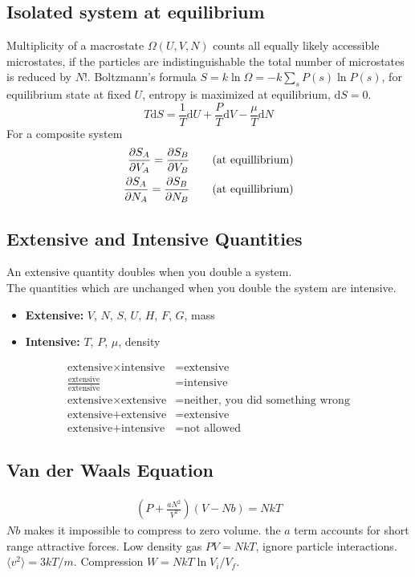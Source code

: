 \documentclass[a4paper, norsk, 8pt]{article}
\begin{document}
\begin{multicols*}{3}
\subsection*{\footnotesize  Isolated system at equilibrium}
Multiplicity of a macrostate $\Omega(U,V,N)$ counts all equally likely accessible microstates, if the particles are indistinguishable the total number of microstates is reduced by $N!$. Boltzmann's formula $S=k\ln{\Omega} = -k\sum_{s}P(s)\ln{P(s)}$, for equilibrium state at fixed $U$, entropy is maximized at equilibrium, $\mbox{d}S=0$.
\begin{equation}
    T\mbox{d}S = \frac{1}{T}\mbox{d}U  + \frac{P}{T}\mbox{d}V - \frac{\mu}{T}\mbox{d}N
\end{equation}
For a composite system
\begin{align*}
  \pdv{S_A}{V_A} = \pdv{S_B}{V_B} \qquad (\text{at equillibrium}) \\
  \pdv{S_A}{N_A} = \pdv{S_B}{N_B} \qquad (\text{at equillibrium})
\end{align*}

\subsection*{\footnotesize  Extensive and Intensive Quantities}
An extensive quantity doubles when you double a system.\\
The quantities which are unchanged when you double the system are intensive.
\begin{itemize}
    \item \textbf{Extensive:} $V$, $N$, $S$, $U$, $H$, $F$, $G$, mass
    \item \textbf{Intensive:} $T$, $P$, $\mu$, density
\end{itemize}
\begin{align*}
    \text{extensive} \times \text{intensive} &= \text{extensive} \\
     \frac{\text{extensive}}{\text{extensive}} &= \text{intensive} \\
     \text{extensive} \times \text{extensive} &= \text{neither, you did something wrong} \\
     \text{extensive} + \text{extensive} &= \text{extensive} \\
     \text{extensive} + \text{intensive} &= \text{not allowed}
\end{align*}


\subsection*{\footnotesize  Van der Waals Equation}
\begin{align*}
    \left( P + \frac{aN^2}{V^2}\right)\left(V-Nb\right) = NkT
\end{align*}
$Nb$ makes it impossible to compress to zero volume. the $a$ term accounts for short range attractive forces.
Low density gas $PV=NkT$, ignore particle interactions. $\langle v^2 \rangle = 3kT/m$. Compression $W =NkT\ln{V_i/V_f}$.


\end{multicols*}
\end{document}
